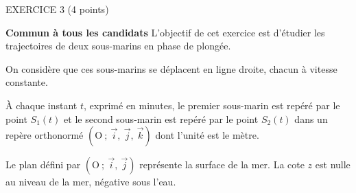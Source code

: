 
\begin{h2}EXERCICE 3 (4 points)\end{h2}
\textbf{Commun à tous les candidats}
\medskip
L'objectif de cet exercice est d'étudier les trajectoires de deux sous-marins en phase de plongée.
\par
On considère que ces sous-marins se déplacent en ligne droite, chacun à vitesse constante.
\par
À chaque instant $t$, exprimé en minutes, le premier sous-marin est repéré par le point $S_1(t)$ et le second
sous-marin est repéré par le point $S_2(t)$ dans un repère orthonormé $\left(\text{O}~;~\vec{i},~\vec{j},~\vec{k}\right)$ dont l'unité est le mètre.
\par
Le plan défini par $\left(\text{O}~;~\vec{i},~\vec{j}\right)$ représente la surface de la mer. La cote $z$ est nulle au niveau de la
mer, négative sous l'eau.
\medskip
